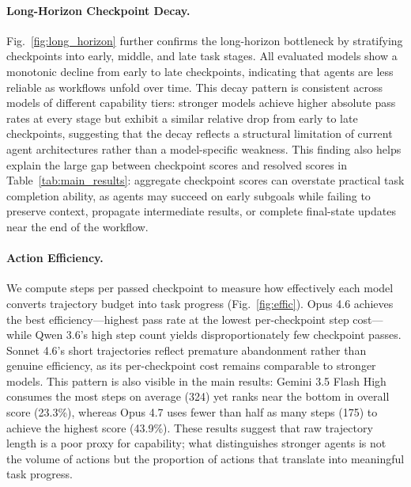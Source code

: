 \paragraph{Long-Horizon Checkpoint Decay.}
Fig.~\ref{fig:long_horizon} further confirms the long-horizon bottleneck by stratifying checkpoints into early, middle, and late task stages. All evaluated models show a monotonic decline from early to late checkpoints, indicating that agents are less reliable as workflows unfold over time. This decay pattern is consistent across models of different capability tiers: stronger models achieve higher absolute pass rates at every stage but exhibit a similar relative drop from early to late checkpoints, suggesting that the decay reflects a structural limitation of current agent architectures rather than a model-specific weakness. This finding also helps explain the large gap between checkpoint scores and resolved scores in Table~\ref{tab:main_results}: aggregate checkpoint scores can overstate practical task completion ability, as agents may succeed on early subgoals while failing to preserve context, propagate intermediate results, or complete final-state updates near the end of the workflow.

\paragraph{Action Efficiency.} We compute steps per passed checkpoint to measure how effectively each model converts trajectory budget into task progress (Fig.~\ref{fig:effic}). Opus 4.6 achieves the best efficiency---highest pass rate at the lowest per-checkpoint step cost---while Qwen 3.6's high step count yields disproportionately few checkpoint passes. Sonnet 4.6's short trajectories reflect premature abandonment rather than genuine efficiency, as its per-checkpoint cost remains comparable to stronger models. This pattern is also visible in the main results: Gemini 3.5 Flash High consumes the most steps on average (324) yet ranks near the bottom in overall score (23.3\%), whereas Opus 4.7 uses fewer than half as many steps (175) to achieve the highest score (43.9\%). These results suggest that raw trajectory length is a poor proxy for capability; what distinguishes stronger agents is not the volume of actions but the proportion of actions that translate into meaningful task progress.
